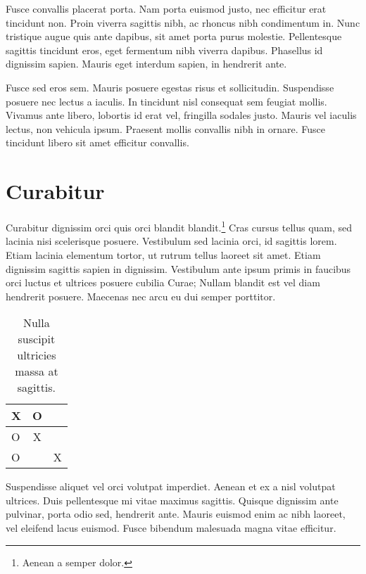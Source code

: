 \documentclass[dissertation]{msudissertation}
\begin{document}
Fusce convallis placerat porta. Nam porta euismod justo, nec efficitur erat tincidunt non. Proin viverra sagittis nibh, ac rhoncus nibh condimentum in. Nunc tristique augue quis ante dapibus, sit amet porta purus molestie. Pellentesque sagittis tincidunt eros, eget fermentum nibh viverra dapibus. Phasellus id dignissim sapien. Mauris eget interdum sapien, in hendrerit ante.

Fusce sed eros sem. Mauris posuere egestas risus et sollicitudin. Suspendisse posuere nec lectus a iaculis. In tincidunt nisl consequat sem feugiat mollis. Vivamus ante libero, lobortis id erat vel, fringilla sodales justo. Mauris vel iaculis lectus, non vehicula ipsum. Praesent mollis convallis nibh in ornare. Fusce tincidunt libero sit amet efficitur convallis.

\section{Curabitur}

Curabitur dignissim orci quis orci blandit blandit.\footnote{Aenean a semper dolor.} Cras cursus tellus quam, sed lacinia nisi scelerisque posuere. Vestibulum sed lacinia orci, id sagittis lorem. Etiam lacinia elementum tortor, ut rutrum tellus laoreet sit amet. Etiam dignissim sagittis sapien in dignissim. Vestibulum ante ipsum primis in faucibus orci luctus et ultrices posuere cubilia Curae; Nullam blandit est vel diam hendrerit posuere. Maecenas nec arcu eu dui semper porttitor.

\begin{landscape}
\begin{table}
  \centering
  \begin{tabular}{l | c | r}
    X & O &   \\ \hline
    O & X &   \\ \hline
    O &   & X \\
  \end{tabular}
  \caption{Nulla suscipit ultricies massa at sagittis.}
\end{table}

Suspendisse aliquet vel orci volutpat imperdiet. Aenean et ex a nisl volutpat ultrices. Duis pellentesque mi vitae maximus sagittis. Quisque dignissim ante pulvinar, porta odio sed, hendrerit ante. Mauris euismod enim ac nibh laoreet, vel eleifend lacus euismod. Fusce bibendum malesuada magna vitae efficitur.
\end{landscape}

\appendix



\renewcommand{\bibname}{References}

\end{document}
